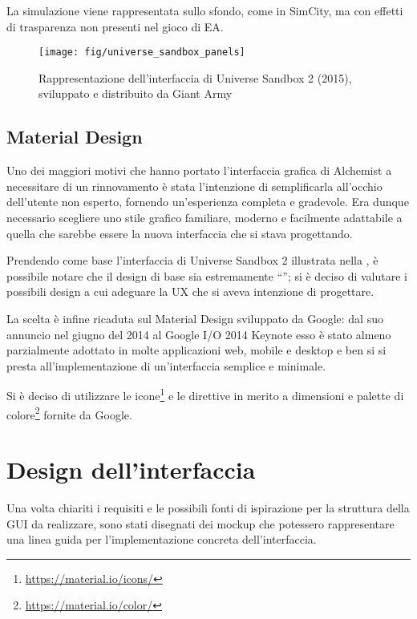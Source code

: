                 La simulazione viene rappresentata sullo sfondo, come in SimCity, ma con effetti di trasparenza non presenti nel gioco di EA.

                \begin{figure}[htbp]
                    \centering
                    \texttt{[image: fig/universe\_sandbox\_panels]}
                    \caption{Rappresentazione dell'interfaccia di Universe Sandbox 2 (2015), sviluppato e distribuito da Giant Army}
                    \label{fig:universesandboxpanels}
                \end{figure}

        \subsection{Material Design}\label{subsec:material}
            Uno dei maggiori motivi che hanno portato l'interfaccia grafica di Alchemist a necessitare di un rinnovamento è stata l'intenzione di semplificarla all'occhio dell'utente non esperto, fornendo un'esperienza completa e gradevole.
            Era dunque necessario scegliere uno stile grafico familiare, moderno e facilmente adattabile a quella che sarebbe essere la nuova interfaccia che si stava progettando.

            Prendendo come base l'interfaccia di Universe Sandbox 2 illustrata nella , è possibile notare che il design di base sia estremamente ``'';
            si è deciso di valutare i possibili design a cui adeguare la UX che si aveva intenzione di progettare.

            La scelta è infine ricaduta sul Material Design sviluppato da Google:
            dal suo annuncio nel giugno del 2014 al Google I/O 2014 Keynote esso è stato almeno parzialmente adottato in molte applicazioni web, mobile e desktop e ben si si presta all'implementazione di un'interfaccia semplice e minimale.

            Si è deciso di utilizzare le icone\footnote{\url{https://material.io/icons/}} e le direttive in merito a dimensioni e palette di colore\footnote{\url{https://material.io/color/}} fornite da Google.

    \section{Design dell'interfaccia}\label{sec:design}
        Una volta chiariti i requisiti e le possibili fonti di ispirazione per la struttura della GUI da realizzare, sono stati disegnati dei mockup che potessero rappresentare una linea guida per l'implementazione concreta dell'interfaccia.

